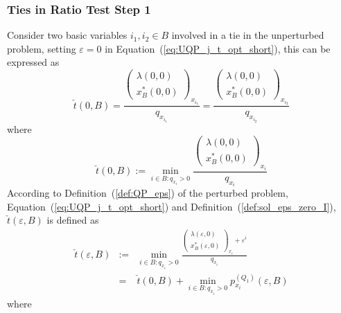 \documentclass[a4paper]{article}
\newcommand{\px}[3]{\ensuremath{p_{x_{#1}}^{(#2)}(\varepsilon, #3)}}
\begin{document}
 
\subsubsection{Ties in Ratio Test Step 1}
\label{sec:Ties_ratio_test_step_1}
Consider two basic variables $i_{1}, i_{2} \in B$ involved in a tie in the
unperturbed problem, setting $\varepsilon=0$ in
Equation~(\ref{eq:UQP_j_t_opt_short}), this can be expressed as
\begin{equation}
\check{t}\left(0, B\right)=
\frac{\left(\begin{array}{c}
              \lambda\left(0, 0 \right) \\
              \hline
               x_{B}^{*}\left(0, 0\right)
            \end{array}
      \right)_{x_{i_{1}}}}{q_{x_{i_{1}}}}
=
\frac{\left(\begin{array}{c}
              \lambda\left(0, 0 \right) \\
              \hline
              x_{B}^{*}\left(0, 0\right) 
            \end{array}
       \right)_{x_{i_{2}}}}{q_{x_{i_{2}}}}
\end{equation}
where
\begin{equation}
\check{t}\left(0, B\right):=\min_{i \in B: q_{x_{i}} > 0}
\frac{\left(\begin{array}{c}
               \lambda\left(0, 0\right) \\
               \hline
               x_{B}^{*}\left(0, 0\right)
            \end{array}
       \right)_{x_{i}}}{q_{x_{i}}}
\end{equation}
According to Definition~(\ref{def:QP_eps}) of the perturbed problem,
Equation~(\ref{eq:UQP_j_t_opt_short}) and
Definition~(\ref{def:sol_eps_zero_I}),
$\check{t}(\varepsilon, B)$
is defined as
\begin{eqnarray}
\label{def:t_min_eps}
\check{t}\left(\varepsilon, B\right) & := &
  \min_{i \in B: q_{x_{i}} > 0}
  \frac{\left(\begin{array}{c}
                \lambda\left(\varepsilon, 0 \right) \\
	        \hline
	        x_{B}^{*}\left(\varepsilon, 0 \right)
	      \end{array}
        \right)_{x_{i}}+ \varepsilon^{i}}{q_{x_{i}}} \\
  &=&
    \check{t}\left(0, B \right) +
  \min_{i \in B: q_{x_{i}} > 0} \px{i}{Q_{1}}{B}
\end{eqnarray}
where
\end{document}
